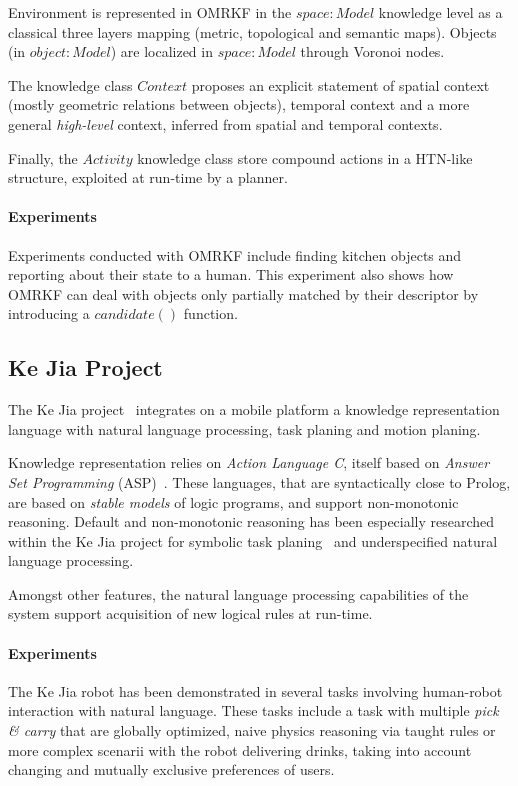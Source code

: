 \documentclass[a4paper, twocolumn]{article}
\begin{document}
Environment is represented in OMRKF in the $space : Model$ knowledge level as a
classical three layers mapping (metric, topological and semantic maps). Objects
(in $object : Model$) are localized in $space : Model$ through Voronoi nodes.

The knowledge class $Context$ proposes an explicit statement of spatial context
(mostly geometric relations between objects), temporal context and a more
general \emph{high-level} context, inferred from spatial and temporal contexts.

Finally, the $Activity$ knowledge class store compound actions in a HTN-like
structure, exploited at run-time by a planner.

\paragraph{Experiments} Experiments conducted with OMRKF include finding
kitchen objects and reporting about their state to a human.  This experiment
also shows how OMRKF can deal with objects only partially matched by their
descriptor by introducing a $candidate()$ function.

\subsection{Ke Jia Project}
\label{sect|kejia}

The Ke Jia project~\cite{Chen2010} integrates on a mobile platform a knowledge
representation language with natural language processing, task planing and
motion planing.

Knowledge representation relies on \emph{Action Language C}, itself based on
\emph{Answer Set Programming} (ASP)~\cite{Gelfond2008}. These languages, that
are syntactically close to Prolog, are based on \emph{stable models} of logic
programs, and support non-monotonic reasoning. Default and non-monotonic
reasoning has been especially researched within the Ke Jia project for symbolic
task planing~\cite{Ji2011} and underspecified natural language processing.

Amongst other features, the natural language processing capabilities of the
system support acquisition of new logical rules at run-time.

\paragraph{Experiments} The Ke Jia robot has been demonstrated in several tasks
involving human-robot interaction with natural language. These tasks include a
task with multiple \emph{pick \& carry} that are globally optimized, naive
physics reasoning via taught rules or more complex scenarii with the robot
delivering drinks, taking into account changing and mutually exclusive
preferences of users.
\end{document}
